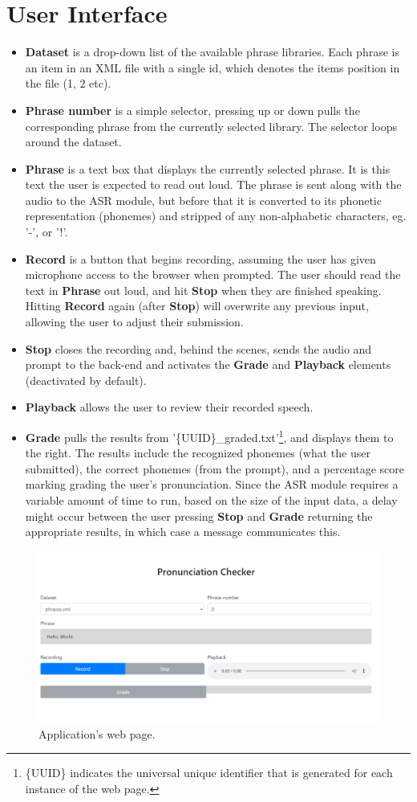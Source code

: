 \documentclass[12pt, letterpaper]{article}
\begin{document}
\section*{User Interface}
\begin{itemize}
    \item \textbf{Dataset} is a drop-down list of the available phrase libraries. Each phrase is an item in an XML file with a single id, which denotes the items position in the file (1, 2 etc).
    \item \textbf{Phrase number} is a simple selector, pressing up or down pulls the corresponding phrase from the currently selected library. The selector loops around the dataset.
    \item \textbf{Phrase} is a text box that displays the currently selected phrase. It is this text the user is expected to read out loud. The phrase is sent along with the audio to the ASR module, but before that it is converted to its phonetic representation (phonemes) and stripped of any non-alphabetic characters, eg. '-', or '!'.
    \item \textbf{Record} is a button that begins recording, assuming the user has given microphone access to the browser when prompted. The user should read the text in \textbf{Phrase} out loud, and hit \textbf{Stop} when they are finished speaking. Hitting \textbf{Record} again (after \textbf{Stop}) will overwrite any previous input, allowing the user to adjust their submission.
    \item \textbf{Stop} closes the recording and, behind the scenes, sends the audio and prompt to the back-end and activates the \textbf{Grade} and \textbf{Playback} elements (deactivated by default).
    \item \textbf{Playback} allows the user to review their recorded speech. 
    \item \textbf{Grade} pulls the results from '\{UUID\}\_graded.txt'\footnote{\{UUID\} indicates the universal unique identifier that is generated for each instance of the web page.}, and displays them to the right. The results include the recognized phonemes (what the user submitted), the correct phonemes (from the prompt), and a percentage score marking grading the user's pronunciation. Since the ASR module requires a variable amount of time to run, based on the size of the input data, a delay might occur between the user pressing \textbf{Stop} and \textbf{Grade} returning the appropriate results, in which case a message communicates this. 
\end{itemize}

\begin{figure}[h!]
    \centering
    \includegraphics[scale=0.5]{images/homepage.pdf}
    \caption{Application's web page.}
\end{figure}
\end{document}
